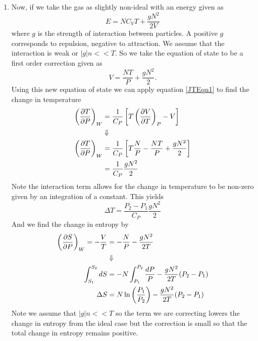 \documentclass[11pt]{article}
\numberwithin{equation}{section}
\begin{document}
\begin{enumerate}[(1)]
\item Now, if we take the gas as slightly non-ideal with an energy given as
$$E = NC_VT + \frac{gN^2}{2V}$$
where $g$ is the strength of interaction between particles. A positive $g$ corresponds to 
repulsion, negative to attraction. We assume that the interaction is weak or $|g|n<<T$. So 
we take the equation of state to be a first order correction given as
$$V = \frac{NT}{P}+\frac{gN^2}{2}.$$
Using this new equation of state we can apply equation \ref{JTEqn1} to find the change in 
temperature
\begin{align*}
\left(\frac{\partial{T}}{\partial{P}}\right)_{W} &= \frac{1}{C_P}\left[T\left(\frac{\partial{V}}{\partial{T}}\right)_{P}-V\right]\\
&\Downarrow\\
\left(\frac{\partial{T}}{\partial{P}}\right)_{W} &= \frac{1}{C_P}\left[T\frac{N}{P}-\frac{NT}{P} + \frac{gN^2}{2}\right] \\
&= \frac{1}{C_P}\frac{gN^2}{2}
\end{align*}
Note the interaction term allows for the change in temperature to be non-zero given by an
integration of a constant. This yields
$$\Delta{T} = \frac{P_2-P_1}{C_P}\frac{gN^2}{2}$$
And we find the change in entropy by
\begin{align*}
\left(\frac{\partial{S}}{\partial{P}}\right)_{W} = -\frac{V}{T} &= -\frac{N}{P} - \frac{gN^2}{2T}\\
&\Downarrow\\
\int_{S_1}^{S_2}dS &= -N\int_{P_1}^{P_2}\frac{dP}{P} - \frac{gN^2}{2T}(P_2-P_1)\\
\Delta{S} &= N\ln\left(\frac{P_1}{P_2}\right) - \frac{gN^2}{2T}(P_2-P_1)
\end{align*}
Note we assume that $|g|n<<T$ so the term we are correcting lowers the change in entropy from
the ideal case but the correction is small so that the total change in entropy remains 
positive.
\end{enumerate}

\pagebreak
\end{document}

